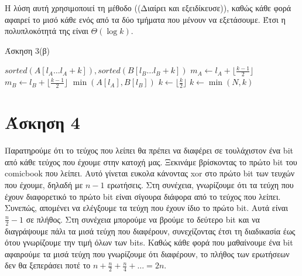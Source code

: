 \documentclass[11pt,a4paper]{book}
\begin{document}
Η λύση αυτή χρησιμοποιεί τη μέθοδο ((Διαίρει και εξειδίκευσε)), καθώς κάθε φορά αφαιρεί το μισό κάθε ενός από τα δύο τμήματα που μένουν να εξετάσουμε. Έτσι η πολυπλοκότητά της είναι $\Theta( \log k )$.

\begin{algorithm}[H]
\caption{\textgreek{Άσκηση 3(β)}}
\begin{algorithmic}[1]
\Require $sorted(A[l_A \dots l_A + k]), sorted(B[l_B \dots l_B + k])$
	\State $m_A \gets l_A + \lfloor \frac{k - 1}{2} \rfloor$
	\State $m_B \gets l_B + \lfloor \frac{k - 1}{2} \rfloor$
        \State \Return $\min( A[ l_A ], B[ l_B ] )$
    \EndIf
    \State $k \gets \lfloor \frac{k}{2} \rfloor$
        \State \Return {}
    \EndIf
    \State \Return {}
\EndProcedure
{}
	\State $k \gets \min(N, k)$
	\State \Return {}
\EndProcedure
\end{algorithmic}
\end{algorithm}

        
\section*{Άσκηση 4}
Παρατηρούμε ότι το τεύχος που λείπει θα πρέπει να διαφέρει σε τουλάχιστον ένα \textlatin{bit} από κάθε τεύχος που έχουμε στην κατοχή μας. Ξεκινάμε βρίσκοντας το πρώτο \textlatin{bit} του \textlatin{comicbook} που λείπει. Αυτό γίνεται ευκολα κάνοντας \textlatin{xor} στο πρώτο \textlatin{bit} των τευχών που έχουμε, δηλαδή με $n - 1$ ερωτήσεις. Στη συνέχεια, γνωρίζουμε ότι τα τεύχη που έχουν διαφορετικό το πρώτο \textlatin{bit} είναι σίγουρα διάφορα από το τεύχος που λείπει. Συνεπώς, απομένει να ελέγξουμε τα τεύχη που έχουν ίδιο το πρώτο \textlatin{bit}. Αυτά είναι $\frac{n}{2} - 1$ σε πλήθος. Στη συνέχεια μπορούμε να βρούμε το δεύτερο \textlatin{bit} και να διαγράψουμε πάλι τα μισά τεύχη που διαφέρουν, συνεχίζοντας έτσι τη διαδικασία έως ότου γνωρίζουμε την τιμή όλων των \textlatin{bits}. Καθώς κάθε φορά που μαθαίνουμε ένα \textlatin{bit} αφαιρούμε τα μισά τεύχη που γνωρίζουμε ότι διαφέρουν, το πλήθος των ερωτήσεων δεν θα ξεπεράσει ποτέ το $n + \frac{n}{2} + \frac{n}{4} + \dots = 2n$.
\end{document}
